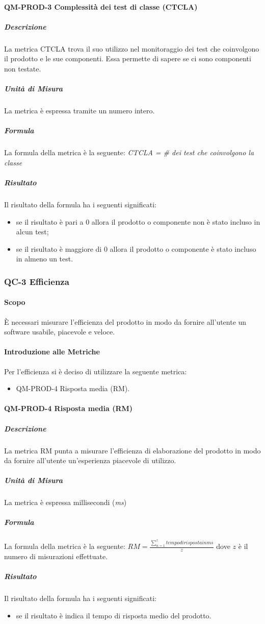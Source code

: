 		\paragraph{QM-PROD-3 Complessità dei test di classe (CTCLA)}
			\subparagraph{Descrizione}
				La metrica CTCLA trova il suo utilizzo nel monitoraggio dei test che coinvolgono il prodotto e le sue componenti. Essa permette di sapere se ci sono componenti non testate.
			\subparagraph{Unità di Misura}
				La metrica è espressa tramite un numero intero.
			\subparagraph{Formula}
				La formula della metrica è la seguente:
				\textit{CTCLA = \# dei test che coinvolgono la classe}
			\subparagraph{Risultato}
				Il risultato della formula ha i seguenti significati:
				\begin{itemize}
					\item se il risultato è pari a 0 allora il prodotto o componente non è stato incluso in alcun test;
					\item se il risultato è maggiore di 0 allora il prodotto o componente è stato incluso in almeno un test.
				\end{itemize}

	\subsubsection{QC-3 Efficienza}
		\paragraph{Scopo}
			È necessari misurare l'efficienza del prodotto in modo da fornire all'utente un software usabile, piacevole e veloce.
		\paragraph{Introduzione alle Metriche}
			Per l'efficienza si è deciso di utilizzare la seguente metrica:
			\begin{itemize}
				\item QM-PROD-4 Risposta media (RM).
			\end{itemize}
		\paragraph{QM-PROD-4 Risposta media (RM)}
			\subparagraph{Descrizione}
				La metrica RM punta a misurare l'efficienza di elaborazione del prodotto in modo da fornire all'utente un'esperienza piacevole di utilizzo.
			\subparagraph{Unità di Misura}
				La metrica è espressa millisecondi (\textit{ms})
			\subparagraph{Formula}
				La formula della metrica è la seguente:
				\(
					RM = \frac{\sum_{n=1}^{z} tempo di risposta in ms}{z}
				\)
				dove $z$ è il numero di misurazioni effettuate.
			\subparagraph{Risultato}
				Il risultato della formula ha i seguenti significati:
				\begin{itemize}
					\item se il risultato è indica il tempo di risposta medio del prodotto.
				\end{itemize}

